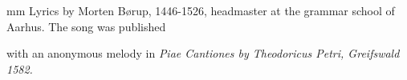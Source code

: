  mm
\noindent Lyrics by Morten B\o{}rup, 1446-1526, headmaster at the
grammar school of Aarhus.  The song was published \par
with an anonymous melody in \it Piae Cantiones
\rm by Theodoricus Petri, Greifswald 1582.
